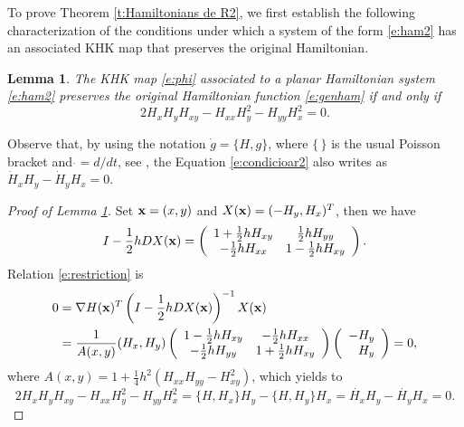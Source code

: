 \documentclass[11pt]{article}
\newtheorem {lemma}  [theorem]{Lemma}
\begin{document}
To prove  Theorem \ref{t:Hamiltonians de R2}, we first establish the following characterization of the conditions under which a system of the form \eqref{e:ham2} has an associated KHK map that preserves the original Hamiltonian.






\begin{lemma}\label{l:invr2}
The KHK map \eqref{e:phi} associated to  a planar Hamiltonian system \eqref{e:ham2} preserves the original Hamiltonian function \eqref{e:genham} if and only if
\begin{equation}\label{e:condicioar2}
2H_xH_yH_{xy}-H_{xx}H_y^2-H_{yy}H_x^2=0.
\end{equation}
 \end{lemma}

  Observe that, by using the notation $\dot{g}=\{H,g\}$, where $\{\,\}$ is the usual Poisson bracket and $\dot{}=d/dt$, see \cite{Marsden1999}, the Equation \eqref{e:condicioar2} also writes as
$\dot{H}_xH_y-\dot{H}_yH_x=0.$


 \begin{proof}[Proof of Lemma \ref{l:invr2}]
Set ${\bf{x}}=(x,y)$ and $X({\bf{x}})=(-H_y, H_x)^T$, then we have
 $$
 I-\frac{1}{2}hDX({\bf{x}})=
 \left(\begin{array}{cc}
1+\frac{1}{2}hH_{xy} & \frac{1}{2}hH_{yy}\\
-\frac{1}{2}hH_{xx} & 1-\frac{1}{2}hH_{xy}
\end{array}
 \right).
 $$
Relation \eqref{e:restriction}  is
\begin{align*}
0&=
\nabla H({\bf{x}})^T \left(I-\frac{1}{2}hDX({\bf{x}})\right)^{-1}X({\bf{x}})\\
&= \frac{1}{A(x,y)}(H_x, H_y) \left(\begin{array}{cc}
 1-\frac{1}{2}hH_{xy} & -\frac{1}{2}hH_{xx}\\
 -\frac{1}{2}hH_{yy}&  1+\frac{1}{2}hH_{xy}
\end{array}
 \right)\left(\begin{array}{r}
 -H_y\\
 H_y
 \end{array}\right)=0,
\end{align*}
where $A(x,y)=1+\frac{1}{4}h^2\left(H_{xx} H_{yy}-H_{xy}^2\right)$, which yields to 
$$ 
2H_xH_yH_{xy}-H_{xx}H_y^2-H_{yy}H_x^2=\{H,H_x\}H_y-\{H,H_y\}H_x=\dot{H_x}H_y-\dot{H_y}H_x=0.
$$
\end{proof}
\end{document}
